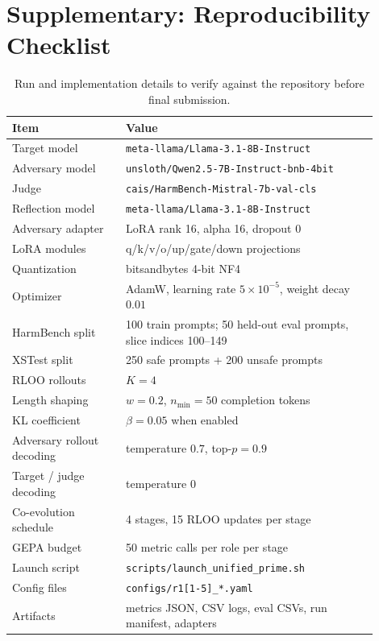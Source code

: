 
\clearpage
\onecolumn
\appendix

\section{Supplementary: Reproducibility Checklist}

\begin{table}[h]
\centering
\caption{Run and implementation details to verify against the repository before final submission.}
\label{tab:repro}
\begin{tabular}{p{0.28\linewidth}p{0.62\linewidth}}
\toprule
Item & Value \\
\midrule
Target model & \texttt{meta-llama/Llama-3.1-8B-Instruct} \\
Adversary model & \texttt{unsloth/Qwen2.5-7B-Instruct-bnb-4bit} \\
Judge & \texttt{cais/HarmBench-Mistral-7b-val-cls} \\
Reflection model & \texttt{meta-llama/Llama-3.1-8B-Instruct} \\
Adversary adapter & LoRA rank 16, alpha 16, dropout 0 \\
LoRA modules & q/k/v/o/up/gate/down projections \\
Quantization & bitsandbytes 4-bit NF4 \\
Optimizer & AdamW, learning rate $5\times 10^{-5}$, weight decay $0.01$ \\
HarmBench split & 100 train prompts; 50 held-out eval prompts, slice indices 100--149 \\
XSTest split & 250 safe prompts + 200 unsafe prompts \\
RLOO rollouts & $K=4$ \\
Length shaping & $w=0.2$, $n_{\min}=50$ completion tokens \\
KL coefficient & $\beta=0.05$ when enabled \\
Adversary rollout decoding & temperature $0.7$, top-$p=0.9$ \\
Target / judge decoding & temperature $0$ \\
Co-evolution schedule & 4 stages, 15 RLOO updates per stage \\
GEPA budget & 50 metric calls per role per stage \\
Launch script & \texttt{scripts/launch\_unified\_prime.sh} \\
Config files & \texttt{configs/r1[1-5]\_*.yaml} \\
Artifacts & metrics JSON, CSV logs, eval CSVs, run manifest, adapters \\
\bottomrule
\end{tabular}
\end{table}

